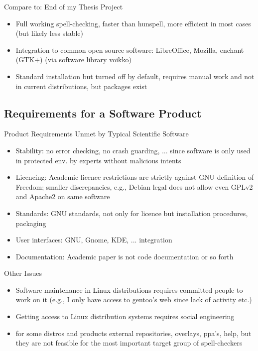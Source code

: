 \documentclass[t,12pt]{beamer}
\begin{document}
\begin{frame}{Compare to: End of my Thesis Project}
    \begin{itemize}
        \item Full working spell-checking, faster than hunspell, more efficient
            in most cases (but likely less stable)
        \item Integration to common open source software: LibreOffice,
            Mozilla, enchant (GTK+) (via software library voikko)
        \item Standard installation but turned off by default, requires manual
            work and not in current distributions, but packages exist
    \end{itemize}
\end{frame}

\subsection{Requirements for a Software Product}

\begin{frame}{Product Requirements Unmet by Typical Scientific Software}
    \begin{itemize}
        \item Stability: no error checking, no crash guarding, ... since software
            is only used in protected env. by experts without malicious intents
        \item Licencing: Academic licence restrictions are strictly against
            GNU definition of Freedom; smaller discrepancies, e.g., Debian legal
            does not allow even GPLv2 and Apache2 on same software
        \item Standards: GNU standards, not only for licence but installation
            procedures, packaging
        \item User interfaces: GNU, Gnome, KDE, ... integration
        \item Documentation: Academic paper is not code documentation or so 
            forth 
    \end{itemize}
\end{frame}

\begin{frame}{Other Issues}
    \begin{itemize}
        \item Software maintenance in Linux distributions requires committed
            people to work on it (e.g., I only have access to gentoo's web since
            lack of activity etc.)
        \item Getting access to Linux distribution systems requires social
            engineering
        \item for some distros and products external repositories, overlays,
            ppa's, help, but they are not feasible for the most important target
            group of spell-checkers
    \end{itemize}
\end{frame}
\end{document}
